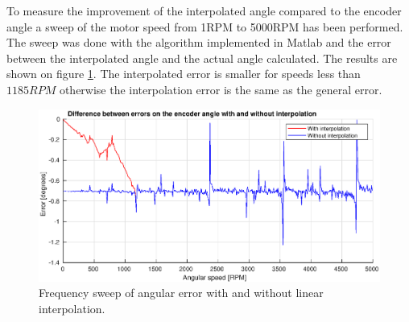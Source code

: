 To measure the improvement of the interpolated angle compared to the encoder angle a sweep of the motor speed from 1RPM to 5000RPM has been performed. The sweep was done with the algorithm implemented in Matlab and the error between the interpolated angle and the actual angle calculated. The results are shown on figure \ref{fig:interpolation_error}. The interpolated error is smaller for speeds less than $1185RPM$ otherwise the interpolation error is the same as the general error.


\begin{figure}[H]
	\centering
	\includegraphics[width=1\textwidth]{pictures/software/interpolation_error.eps}
	\caption{Frequency sweep of angular error with and without linear interpolation.}
	\label{fig:interpolation_error}
\end{figure}


